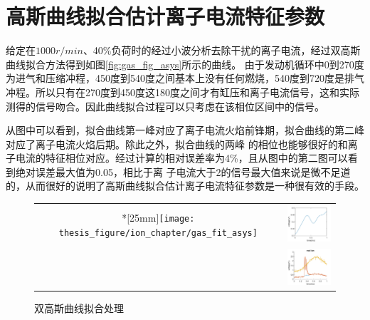 \section{高斯曲线拟合估计离子电流特征参数}
给定在$1000r/min$、40\%负荷时的经过小波分析去除干扰的离子电流，经过双高斯曲线拟合方法得到如图\ref{fig:gas_fig_asys}所示的曲线。
由于发动机循环中0到270度为进气和压缩冲程，450度到540度之间基本上没有任何燃烧，540度到720度是排气冲程。所以只有在270度到450度这180度之间才有缸压和离子电流信号，这和实际
测得的信号吻合。因此曲线拟合过程可以只考虑在该相位区间中的信号。\par
从图中可以看到，拟合曲线第一峰对应了离子电流火焰前锋期，拟合曲线的第二峰对应了离子电流火焰后期。除此之外，拟合曲线的两峰
的相位也能够很好的和离子电流的特征相位对应。经过计算的相对误差率为4\%，且从图中的第二图可以看到绝对误差最大值为0.05，相比于离
子电流大于2的信号最大值来说是微不足道的，从而很好的说明了高斯曲线拟合估计离子电流特征参数是一种很有效的手段。
\begin{figure}[!ht]
	\centering
	\begin{tabular}{cc}
	\multicolumn{1}{c}{
		\multirow{2}*[25mm]{\texttt{[image: thesis\_figure/ion\_chapter/gas\_fit\_asys]}}}
		&\includegraphics[width=32mm]{thesis_figure/ion_chapter/dmey_diffSign}\\
		&\includegraphics[width=32mm]{thesis_figure/ion_chapter/dmey_realIonFig}
	\end{tabular}
	\caption{\label{fig:gas_fit_asys}双高斯曲线拟合处理}
\end{figure}
